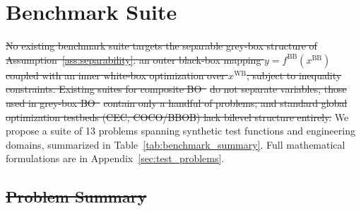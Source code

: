 \documentclass[12pt,a4paper]{article}%
\theoremstyle{plain}%
\theoremstyle{remark}%
\theoremstyle{definition}%
\def\WB{\mathrm{WB}}
\def\BB{\mathrm{BB}}
\providecommand{\DIFaddtex}[1]{{\protect\color{blue}\uwave{#1}}} %
\providecommand{\DIFdeltex}[1]{{\protect\color{red}\sout{#1}}}                      %
\providecommand{\DIFaddbegin}{} %
\providecommand{\DIFaddend}{} %
\providecommand{\DIFdelbegin}{} %
\providecommand{\DIFdelend}{} %
\providecommand{\DIFadd}[1]{\texorpdfstring{\DIFaddtex{#1}}{#1}} %
\providecommand{\DIFdel}[1]{\texorpdfstring{\DIFdeltex{#1}}{}} %
\newcommand{\DIFscaledelfig}{0.5}
\newlength{\DIFdelgraphicswidth} %
\newlength{\DIFdelgraphicsheight} %
\newcommand{\DIFaddincludegraphics}[2][]{{\color{blue}\fbox{\DIFOincludegraphics[#1]{#2}}}} %
\newcommand{\DIFdelincludegraphics}[2][]{%
\sbox{\DIFdelgraphicsbox}{\DIFOincludegraphics[#1]{#2}}%
\settoboxwidth{\DIFdelgraphicswidth}{\DIFdelgraphicsbox} %
\settoboxtotalheight{\DIFdelgraphicsheight}{\DIFdelgraphicsbox} %
\scalebox{\DIFscaledelfig}{%
\parbox[b]{\DIFdelgraphicswidth}{\usebox{\DIFdelgraphicsbox}\\[-\baselineskip] \rule{\DIFdelgraphicswidth}{0em}}\llap{\resizebox{\DIFdelgraphicswidth}{\DIFdelgraphicsheight}{%
\setlength{\unitlength}{\DIFdelgraphicswidth}%
\begin{picture}(1,1)%
\thicklines\linethickness{2pt} %
{\color[rgb]{1,0,0}\put(0,0){\framebox(1,1){}}}%
{\color[rgb]{1,0,0}\put(0,0){\line( 1,1){1}}}%
{\color[rgb]{1,0,0}\put(0,1){\line(1,-1){1}}}%
\end{picture}%
}\hspace*{3pt}}} %
} %
\DeclareRobustCommand{\DIFaddbegin}{\DIFOaddbegin \let\includegraphics\DIFaddincludegraphics} %
\DeclareRobustCommand{\DIFaddend}{\DIFOaddend \let\includegraphics\DIFOincludegraphics} %
\DeclareRobustCommand{\DIFdelbegin}{\DIFOdelbegin \let\includegraphics\DIFdelincludegraphics} %
\DeclareRobustCommand{\DIFdelend}{\DIFOaddend \let\includegraphics\DIFOincludegraphics} %
\begin{document}
\section{Benchmark \DIFaddbegin \DIFadd{Problem }\DIFaddend Suite}\label{sec:benchmark_suite}

\DIFdelbegin \DIFdel{No existing benchmark suite targets the separable grey-box structure of Assumption~\ref{ass:separability}: an outer black-box mapping $y = f^{\BB}(x^{\BB})$ coupled with an inner white-box optimization over $x^{\WB}$, subject to inequality constraints. Existing suites for composite BO~}%
\DIFdel{do not separate variables; those used in grey-box BO~}%
\DIFdel{contain only a handful of problems; and standard global optimization testbeds (CEC, COCO/BBOB) lack bilevel structure entirely. }\DIFdelend We propose a suite of 13 problems spanning synthetic test functions and engineering domains, summarized in Table~\ref{tab:benchmark_summary}. Full mathematical formulations are in Appendix~\ref{sec:test_problems}.\DIFdelbegin %

\subsection{\DIFdel{Problem Summary}}%
\addtocounter{subsection}{-1}%
\end{document}

